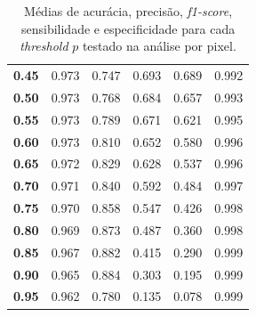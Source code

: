 \begin{table}
\begin{tiny}
\begin{tabular}{|l|l|l|l|l|l|}
\cellcolor[HTML]{EFEFEF}\textbf{0.45}   & 0.973                 & 0.747               & 0.693                     & 0.689                    & 0.992                       \\ \cline{1-6}
\cellcolor[HTML]{EFEFEF}\textbf{0.50}   & 0.973                 & 0.768               & 0.684                     & 0.657                    & 0.993                       \\ \cline{1-6}
\cellcolor[HTML]{EFEFEF}\textbf{0.55}   & 0.973                 & 0.789               & 0.671                     & 0.621                    & 0.995                       \\ \cline{1-6} 
\cellcolor[HTML]{EFEFEF}\textbf{0.60}   & 0.973                 & 0.810               & 0.652                     & 0.580                    & 0.996                       \\ \cline{1-6}
\cellcolor[HTML]{EFEFEF}\textbf{0.65}   & 0.972                 & 0.829               & 0.628                     & 0.537                    & 0.996                       \\ \cline{1-6}
\cellcolor[HTML]{EFEFEF}\textbf{0.70}   & 0.971                 & 0.840               & 0.592                     & 0.484                    & 0.997                       \\ \cline{1-6}
\cellcolor[HTML]{EFEFEF}\textbf{0.75}   & 0.970                 & 0.858               & 0.547                     & 0.426                    & 0.998                       \\ \cline{1-6} 
\cellcolor[HTML]{EFEFEF}\textbf{0.80}   & 0.969                 & 0.873               & 0.487                     & 0.360                    & 0.998                       \\ \cline{1-6}
\cellcolor[HTML]{EFEFEF}\textbf{0.85}   & 0.967                 & 0.882               & 0.415                     & 0.290                    & 0.999                       \\ \cline{1-6}
\cellcolor[HTML]{EFEFEF}\textbf{0.90}   & 0.965                 & 0.884               & 0.303                     & 0.195                    & 0.999                       \\ \cline{1-6}
\cellcolor[HTML]{EFEFEF}\textbf{0.95}   & 0.962                 & 0.780               & 0.135                     & 0.078                    & 0.999                       \\ \cline{1-6}
\end{tabular}
\end{tiny}
\caption{Médias de acurácia, precisão, \textit{f1-score}, sensibilidade e especificidade para cada \textit{threshold} $p$ testado na análise por pixel.}
    \label{tab:metricas-variando-p}
\end{table}

